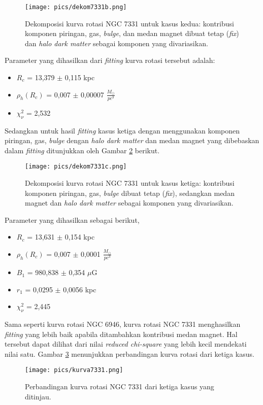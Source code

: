 \begin{figure}[H]
\centering 
\texttt{[image: pics/dekom7331b.png]}
\caption[Plot Kurva Rotasi Galaksi NGC 7331 dengan Medan Magnet yang Difiksasi]{Dekomposisi kurva rotasi NGC 7331 untuk kasus kedua: kontribusi komponen piringan, gas, \textit{bulge}, dan medan magnet dibuat tetap (\textit{fix}) dan \textit{halo dark matter} sebagai komponen yang divariasikan.}
\label{fig:ngc7331b}
\end{figure}
Parameter yang dihasilkan dari \textit{fitting} kurva rotasi tersebut adalah:
\begin{itemize}
\item $R_{c}$ = 13,379 $\pm$ 0,115 kpc
\item $\rho_{h}(R_{c})$ = 0,007 $\pm$ 0,00007 $\frac{M_{\odot}}{pc^{3}}$
\item $\chi_{\nu}^{2}$ = 2,532
\end{itemize}
	Sedangkan untuk hasil \textit{fitting} kasus ketiga dengan menggunakan komponen piringan, gas, \textit{bulge} dengan \textit{halo dark matter} dan medan magnet yang dibebaskan dalam \textit{fitting} ditunjukkan oleh Gambar \ref{fig:ngc7331c} berikut.\\
\begin{figure}[H]
\centering 
\texttt{[image: pics/dekom7331c.png]}
\caption[Plot Kurva Rotasi Galaksi NGC 7331 dengan Medan Magnet yang Dibebaskan]{Dekomposisi kurva rotasi NGC 7331 untuk kasus ketiga: kontribusi komponen piringan, gas, \textit{bulge} dibuat tetap (\textit{fix}), sedangkan medan magnet dan \textit{halo 
dark matter} sebagai komponen yang divariasikan.}
\label{fig:ngc7331c}
\end{figure}
Parameter yang dihasilkan sebagai berikut,
\begin{itemize}
\item $R_{c}$ = 13,631 $\pm$ 0,154 kpc
\item $\rho_{h}(R_{c})$ = 0,007 $\pm$ 0,0001 $\frac{M_{\odot}}{pc^{3}}$
\item $B_{1}$ = 980,838 $\pm$ 0,354 $\mu$G
\item $r_{1}$ = 0,0295 $\pm$ 0,0056 kpc
\item $\chi_{\nu}^{2}$ = 2,445 
\end{itemize}
	Sama seperti kurva rotasi NGC 6946, kurva rotasi NGC 7331 menghasilkan \textit{fitting} yang lebih baik apabila ditambahkan kontribusi medan magnet.  Hal tersebut dapat dilihat dari nilai \textit{reduced chi-square} yang lebih kecil mendekati nilai satu. Gambar \ref{fig:kurva7331} menunjukkan perbandingan kurva rotasi dari ketiga kasus.\\
\begin{figure}[H]
\centering 
\texttt{[image: pics/kurva7331.png]}
\caption[Plot Perbandingan Kurva Rotasi NGC 7331 dengan Tiga Kasus.]{Perbandingan kurva rotasi NGC 7331 dari ketiga kasus yang ditinjau. }
\label{fig:kurva7331}
\end{figure}

